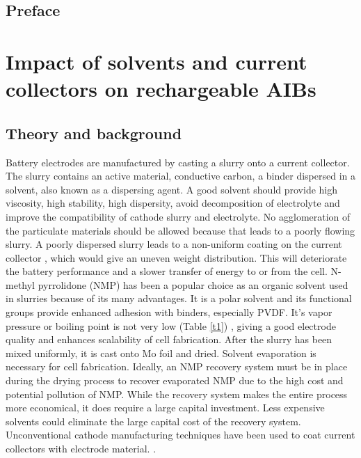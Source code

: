 \section*{Preface}

\pagebreak

\chapter{Impact of solvents and current collectors on rechargeable AIBs} %
\label{chap7} %

\section{Theory and background}
Battery electrodes are manufactured by casting a slurry onto a current collector. The slurry contains an active material, conductive carbon, a binder dispersed in a solvent, also known as a dispersing agent. A good solvent should provide high viscosity, high stability, high dispersity, avoid decomposition of electrolyte and improve the compatibility of cathode slurry and electrolyte\cite{ludwig_solvent-free_2016}. No agglomeration of the particulate materials should be allowed because that leads to a poorly flowing slurry. A poorly dispersed slurry leads to a non-uniform coating on the current collector , which would give an uneven weight distribution. This will deteriorate the battery performance and a slower transfer of energy to or from the cell. N-methyl pyrrolidone (NMP) has been a popular choice as an organic solvent used in slurries because of its many advantages. It is a polar solvent and its functional groups provide enhanced adhesion with binders, especially PVDF. It's vapor pressure or boiling point is not very low (Table \ref{t1}) , giving a good electrode quality and enhances scalability of cell fabrication. 
After the slurry has been mixed uniformly, it is cast onto Mo foil and dried. Solvent evaporation is necessary for cell fabrication. Ideally, an NMP recovery system must be in place during the drying process to recover evaporated NMP due to the high cost and potential pollution of NMP. While the recovery system makes the entire process more economical, it does require a large capital investment. Less expensive solvents could eliminate the large capital cost of the recovery system. Unconventional cathode manufacturing techniques have been used to coat current collectors with electrode material. \cite{liu_effective_2014-1,spreafico_pvdf_2014-1, liu_effects_2008-1, lee_effect_2010-1, wenzel_challenges_2015}.
